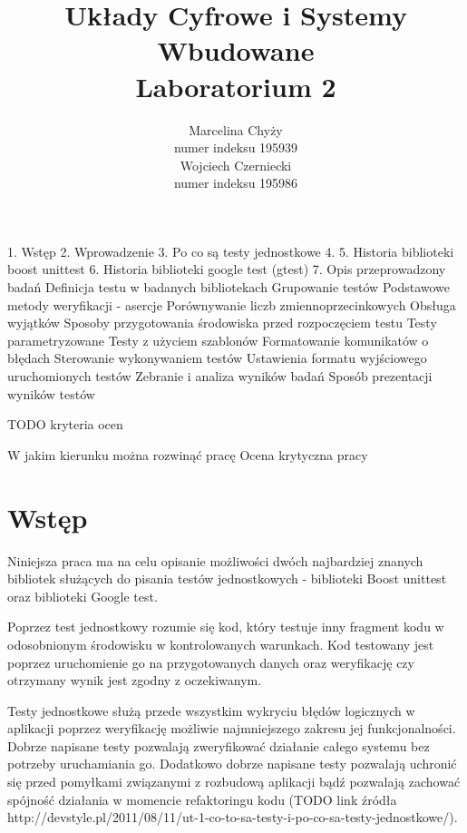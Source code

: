 \documentclass[12pt,a4paper,notitlepage]{report}
\author{Marcelina Chyży\\numer indeksu 195939\\Wojciech Czerniecki\\numer indeksu 195986}
\title{Układy Cyfrowe i Systemy Wbudowane \\ \small Laboratorium 2}
\makeatletter
\newcommand{\linia}{\rule{\linewidth}{0.4mm}}
\renewcommand{\maketitle}{
	\begin{titlepage}
		\vspace*{1cm}
		\begin{center}\small
			Politechnika Wrocławksa\\
			Wydział Elektorniki
		\end{center}
		\vspace{3cm}
		\noindent
		\linia
		\begin{center}
			\LARGE \textsc{\@title}
		\end{center}
		\linia
		\vspace{5.5cm}
		\begin{flushright}
			\begin{minipage}{5cm}
				\textit{\small Autorzy:}\\
				\normalsize \textsc{\@author} \par
			\end{minipage}
		\end{flushright}
		\vspace*{\stretch{6}}
		\begin{center}
			\@date
		\end{center}
	\end{titlepage}%
}
\makeatother
\begin{document}
	
	
	\newpage\thispagestyle{empty}
	\mbox{}
	
	\tableofcontents
	
	\renewcommand*\sectionmark[1]{\markboth{#1}{}}
	\renewcommand*\subsectionmark[1]{\markright{#1}}
	
1. Wstęp
2. Wprowadzenie
3. Po co są testy jednostkowe
4. 
5. Historia biblioteki boost unittest
6. Historia biblioteki google test (gtest)
7. Opis przeprowadzony badań
Definicja testu w badanych bibliotekach
Grupowanie testów
Podstawowe metody weryfikacji - asercje
Porównywanie liczb zmiennoprzecinkowych
Obsługa wyjątków
Sposoby przygotowania środowiska przed rozpoczęciem testu
Testy parametryzowane
Testy z użyciem szablonów
Formatowanie komunikatów o błędach
Sterowanie wykonywaniem testów
Ustawienia formatu wyjściowego uruchomionych testów
Zebranie i analiza wyników badań
Sposób prezentacji wyników testów

TODO kryteria ocen

W jakim kierunku można rozwinąć pracę
Ocena krytyczna pracy

\chapter{Wstęp}

Niniejsza praca ma na celu opisanie możliwości dwóch najbardziej znanych bibliotek służących do pisania testów jednostkowych - biblioteki Boost unittest oraz biblioteki Google test.

Poprzez test jednostkowy rozumie się kod, który testuje inny fragment kodu w odosobnionym środowisku w kontrolowanych warunkach. Kod testowany jest poprzez uruchomienie go na przygotowanych danych oraz weryfikację czy otrzymany wynik jest zgodny z oczekiwanym.

Testy jednostkowe służą przede wszystkim wykryciu błędów logicznych w aplikacji poprzez weryfikację możliwie najmniejszego zakresu jej funkcjonalności. Dobrze napisane testy pozwalają zweryfikować działanie całego systemu bez potrzeby uruchamiania go. Dodatkowo dobrze napisane testy pozwalają uchronić się przed pomyłkami związanymi z rozbudową aplikacji bądź pozwalają zachować spójność działania w momencie refaktoringu kodu (TODO link źródła http://devstyle.pl/2011/08/11/ut-1-co-to-sa-testy-i-po-co-sa-testy-jednostkowe/).
\end{document}
